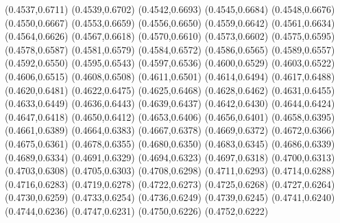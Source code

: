 \PST@Filltriangle(0.4537,0.6711)
\PST@Filltriangle(0.4539,0.6702)
\PST@Filltriangle(0.4542,0.6693)
\PST@Filltriangle(0.4545,0.6684)
\PST@Filltriangle(0.4548,0.6676)
\PST@Filltriangle(0.4550,0.6667)
\PST@Filltriangle(0.4553,0.6659)
\PST@Filltriangle(0.4556,0.6650)
\PST@Filltriangle(0.4559,0.6642)
\PST@Filltriangle(0.4561,0.6634)
\PST@Filltriangle(0.4564,0.6626)
\PST@Filltriangle(0.4567,0.6618)
\PST@Filltriangle(0.4570,0.6610)
\PST@Filltriangle(0.4573,0.6602)
\PST@Filltriangle(0.4575,0.6595)
\PST@Filltriangle(0.4578,0.6587)
\PST@Filltriangle(0.4581,0.6579)
\PST@Filltriangle(0.4584,0.6572)
\PST@Filltriangle(0.4586,0.6565)
\PST@Filltriangle(0.4589,0.6557)
\PST@Filltriangle(0.4592,0.6550)
\PST@Filltriangle(0.4595,0.6543)
\PST@Filltriangle(0.4597,0.6536)
\PST@Filltriangle(0.4600,0.6529)
\PST@Filltriangle(0.4603,0.6522)
\PST@Filltriangle(0.4606,0.6515)
\PST@Filltriangle(0.4608,0.6508)
\PST@Filltriangle(0.4611,0.6501)
\PST@Filltriangle(0.4614,0.6494)
\PST@Filltriangle(0.4617,0.6488)
\PST@Filltriangle(0.4620,0.6481)
\PST@Filltriangle(0.4622,0.6475)
\PST@Filltriangle(0.4625,0.6468)
\PST@Filltriangle(0.4628,0.6462)
\PST@Filltriangle(0.4631,0.6455)
\PST@Filltriangle(0.4633,0.6449)
\PST@Filltriangle(0.4636,0.6443)
\PST@Filltriangle(0.4639,0.6437)
\PST@Filltriangle(0.4642,0.6430)
\PST@Filltriangle(0.4644,0.6424)
\PST@Filltriangle(0.4647,0.6418)
\PST@Filltriangle(0.4650,0.6412)
\PST@Filltriangle(0.4653,0.6406)
\PST@Filltriangle(0.4656,0.6401)
\PST@Filltriangle(0.4658,0.6395)
\PST@Filltriangle(0.4661,0.6389)
\PST@Filltriangle(0.4664,0.6383)
\PST@Filltriangle(0.4667,0.6378)
\PST@Filltriangle(0.4669,0.6372)
\PST@Filltriangle(0.4672,0.6366)
\PST@Filltriangle(0.4675,0.6361)
\PST@Filltriangle(0.4678,0.6355)
\PST@Filltriangle(0.4680,0.6350)
\PST@Filltriangle(0.4683,0.6345)
\PST@Filltriangle(0.4686,0.6339)
\PST@Filltriangle(0.4689,0.6334)
\PST@Filltriangle(0.4691,0.6329)
\PST@Filltriangle(0.4694,0.6323)
\PST@Filltriangle(0.4697,0.6318)
\PST@Filltriangle(0.4700,0.6313)
\PST@Filltriangle(0.4703,0.6308)
\PST@Filltriangle(0.4705,0.6303)
\PST@Filltriangle(0.4708,0.6298)
\PST@Filltriangle(0.4711,0.6293)
\PST@Filltriangle(0.4714,0.6288)
\PST@Filltriangle(0.4716,0.6283)
\PST@Filltriangle(0.4719,0.6278)
\PST@Filltriangle(0.4722,0.6273)
\PST@Filltriangle(0.4725,0.6268)
\PST@Filltriangle(0.4727,0.6264)
\PST@Filltriangle(0.4730,0.6259)
\PST@Filltriangle(0.4733,0.6254)
\PST@Filltriangle(0.4736,0.6249)
\PST@Filltriangle(0.4739,0.6245)
\PST@Filltriangle(0.4741,0.6240)
\PST@Filltriangle(0.4744,0.6236)
\PST@Filltriangle(0.4747,0.6231)
\PST@Filltriangle(0.4750,0.6226)
\PST@Filltriangle(0.4752,0.6222)
